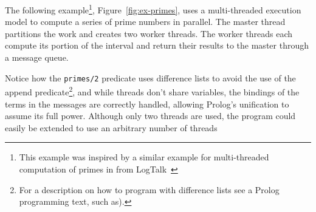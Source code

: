 The following example\footnote{This example was inspired by a similar
  example for multi-threaded computation of primes in from
  LogTalk~\cite{log-man}}, Figure~\ref{fig:ex-primes}, uses a
multi-threaded execution model to compute a series of prime numbers in
parallel.  The master thread partitions the work and creates two
worker threads.  The worker threads each compute its portion of the
interval and return their results to the master through a message
queue.

Notice how the \texttt{primes/2} predicate uses difference lists to
avoid the use of the append predicate\footnote{For a description on
  how to program with difference lists see a Prolog programming text,
  such as\cite{StSh86}).}, and while threads don't share variables,
the bindings of the terms in the messages are correctly handled,
allowing Prolog's unification to assume its full power.  Although only
two threads are used, the program could easily be extended to use an
arbitrary number of threads

